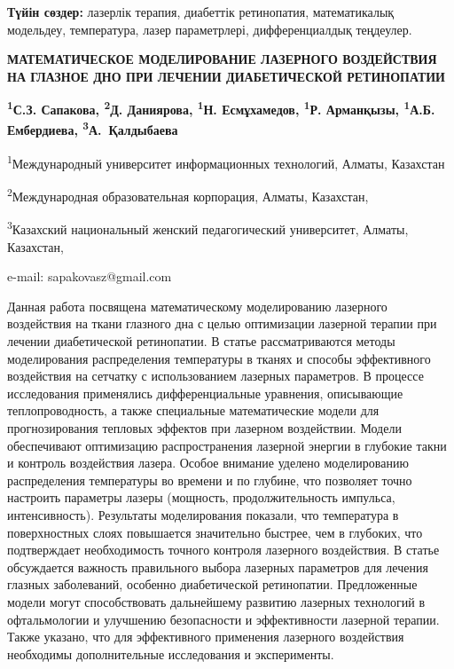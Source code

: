 {\bfseries Түйін сөздер:} лазерлік терапия, диабеттік ретинопатия,
математикалық модельдеу, температура, лазер параметрлері,
дифференциалдық теңдеулер.

\begin{articleheader}
{\bfseries МАТЕМАТИЧЕСКОЕ МОДЕЛИРОВАНИЕ ЛАЗЕРНОГО ВОЗДЕЙСТВИЯ НА ГЛАЗНОЕ ДНО ПРИ ЛЕЧЕНИИ ДИАБЕТИЧЕСКОЙ РЕТИНОПАТИИ}

{\bfseries
\textsuperscript{1}С.З. Сапакова\textsuperscript{\envelope },
\textsuperscript{2}Д. Даниярова,
\textsuperscript{1}Н. Есмұхамедов,
\textsuperscript{1}Р. Арманқызы,
\textsuperscript{1}А.Б. Ембердиева,
\textsuperscript{3}А.~Қалдыбаева
}
\end{articleheader}

\begin{affiliation}
\textsuperscript{1}Международный университет информационных технологий, Алматы, Казахстан

\textsuperscript{2}Международная образовательная корпорация, Алматы, Казахстан,

\textsuperscript{3}Казахский национальный женский педагогический университет, Алматы, Казахстан,

e-mail: sapakovasz@gmail.com
\end{affiliation}

Данная работа посвящена математическому моделированию лазерного
воздействия на ткани глазного дна с целью оптимизации лазерной терапии
при лечении диабетической ретинопатии. В статье рассматриваются методы
моделирования распределения температуры в тканях и способы эффективного
воздействия на сетчатку с использованием лазерных параметров. В процессе
исследования применялись дифференциальные уравнения, описывающие
теплопроводность, а также специальные математические модели для
прогнозирования тепловых эффектов при лазерном воздействии. Модели
обеспечивают оптимизацию распространения лазерной энергии в глубокие
такни и контроль воздействия лазера. Особое внимание уделено
моделированию распределения температуры во времени и по глубине, что
позволяет точно настроить параметры лазеры (мощность, продолжительность
импульса, интенсивность). Результаты моделирования показали, что
температура в поверхностных слоях повышается значительно быстрее, чем в
глубоких, что подтверждает необходимость точного контроля лазерного
воздействия. В статье обсуждается важность правильного выбора лазерных
параметров для лечения глазных заболеваний, особенно диабетической
ретинопатии. Предложенные модели могут способствовать дальнейшему
развитию лазерных технологий в офтальмологии и улучшению безопасности и
эффективности лазерной терапии. Также указано, что для эффективного
применения лазерного воздействия необходимы дополнительные исследования
и эксперименты.

